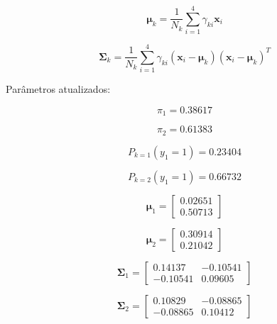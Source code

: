 \documentclass[a4paper,12pt]{article} %
\begin{document}
\begin{enumerate}
\begin{equation}
    \boldsymbol{\mu}_k = \frac{1}{N_k} \sum_{i=1}^4 \gamma_{ki} \mathbf{x}_i    
\end{equation}

\begin{equation}
    \boldsymbol{\Sigma}_k = \frac{1}{N_k} \sum_{i=1}^4 \gamma_{ki} (\mathbf{x}_i - \boldsymbol{\mu}_k)(\mathbf{x}_i - \boldsymbol{\mu}_k)^T
\end{equation}


Parâmetros atualizados:

\begin{equation*}
    \pi_1 = 0.38617
\end{equation*}

\begin{equation*}
    \pi_2 = 0.61383
\end{equation*}

\begin{equation*}
    P_{k=1}(y_1=1) = 0.23404
\end{equation*}

\begin{equation*}
    P_{k=2}(y_1=1) = 0.66732
\end{equation*}

\begin{equation*}
    \boldsymbol{\mu}_1 = \begin{bmatrix}
    0.02651 \\
    0.50713
\end{bmatrix}
\end{equation*}

\begin{equation*}
    \boldsymbol{\mu}_2 = \begin{bmatrix}
    0.30914 \\
    0.21042
\end{bmatrix}
\end{equation*}

\begin{equation*}
    \boldsymbol{\Sigma}_1 = \begin{bmatrix}
    0.14137 & -0.10541 \\
    -0.10541 & 0.09605
\end{bmatrix}
\end{equation*}

\begin{equation*}
    \boldsymbol{\Sigma}_2 = \begin{bmatrix}
    0.10829 & -0.08865 \\
    -0.08865 & 0.10412
\end{bmatrix}
\end{equation*}


\end{enumerate}
\end{document}
